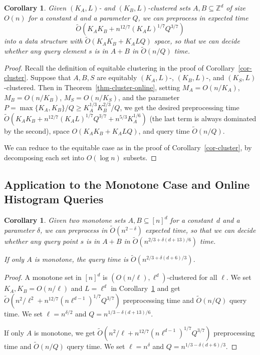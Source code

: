 \documentclass[11pt]{article}
\newtheorem{corollary}[theorem]{Corollary}
\newcommand{\Z}{\mathbb{Z}}
\newcommand{\OO}{\widetilde{O}}
\begin{document}
{\begin{corollary}\label{cor-cluster-online}
Given $(K_A,L)$- and $(K_B,L)$-clustered sets $A,B\subseteq\Z^d$ of size $O(n)$ for a constant $d$ and a parameter $Q$,
we can preprocess in expected time
$$\OO(K_AK_B + n^{12/7} (K_AL)^{1/7}Q^{3/7})$$
into a data structure with $\OO(K_AK_B + K_ALQ)$ space,
so that we can decide whether any query element $s$ is in $A+B$
in $\OO(n/Q)$ time.
\end{corollary}
\begin{proof}
Recall the definition of equitable clustering in the proof of Corollary~\ref{cor-cluster}.
Suppose that $A,B,S$
are equitably  $(K_A,L)$-, $(K_B,L)$-, and $(K_S,L)$-clustered.
Then in Theorem~\ref{thm-cluster-online}, setting $M_A=O(n/K_A)$,
$M_B=O(n/K_B)$, $M_S=O(n/K_S)$, and the parameter
$P=\max\{K_A,K_B\}/Q\ge K_A^{1/3}K_B^{2/3}/Q$,
we get the desired preprocessing time
$\OO(K_AK_B + n^{12/7} (K_AL)^{1/7}Q^{3/7} + n^{5/3}K_A^{1/6})$
(the last term is always dominated by the second),
space $O(K_AK_B + K_ALQ)$,
and query time $\OO(n/Q)$.

We can reduce to the equitable case as in the proof of Corollary~\ref{cor-cluster}, by decomposing each set into
$O(\log n)$ subsets.
\end{proof}

\subsection{Application to the Monotone Case and
Online Histogram Queries}

\begin{corollary}\label{cor-monotone-online}
Given two monotone sets $A,B\subseteq [n]^d$ for a constant~$d$
and a parameter $\delta$,
we can preprocess in $\OO(n^{2-\delta})$ expected time,
so that we can decide whether any query point $s$ is in $A+B$
in $\OO(n^{2/3 + \delta (d+13)/6})$ time.

If only $A$ is monotone, the query time is
$\OO(n^{2/3+\delta (d+6)/3})$.
\end{corollary}
\begin{proof}
A monotone set in $[n]^d$ is $(O(n/\ell),\ell^d)$-clustered
for all $\ell$.  We set $K_A,K_B=O(n/\ell)$ and $L=\ell^d$
in Corollary~\ref{cor-cluster-online}
and get $\OO(n^2/\ell^2 + n^{12/7}(n\ell^{d-1})^{1/7}Q^{3/7})$
preprocessing time and $\OO(n/Q)$ query time.
We set $\ell=n^{\delta/2}$ and $Q=n^{1/3-\delta (d+13)/6}$.

If only $A$ is monotone, we get
 $\OO(n^2/\ell + n^{12/7}(n\ell^{d-1})^{1/7}Q^{3/7})$
preprocessing time and $\OO(n/Q)$ query time.
We set $\ell=n^{\delta}$ and $Q=n^{1/3-\delta (d+6)/3}$.
\end{proof}

}
\end{document}
